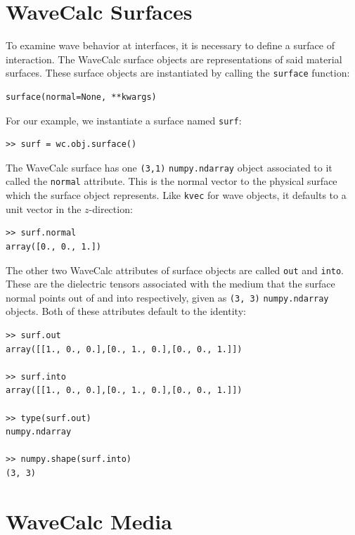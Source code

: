 \documentclass[11pt, reqno]{book}%
\newcounter{ct}
\newcommand{\tw}[1]{{\tt #1}}
\begin{document}
\section{WaveCalc Surfaces}
\label{sec:wcsurfaces}

To examine wave behavior at interfaces, it is necessary to define a surface of interaction. The WaveCalc surface objects are representations of said material surfaces. These surface objects are instantiated by calling the \tw{surface} function:
\begin{verbatim}
surface(normal=None, **kwargs)
\end{verbatim}
\noindent For our example, we instantiate a surface named \tw{surf}:
\begin{verbatim}
>> surf = wc.obj.surface()
\end{verbatim}
The WaveCalc surface has one \tw{(3,1)} \tw{numpy.ndarray} object associated to it called the \tw{normal} attribute. This is the normal vector to the physical surface which the surface object represents. Like \tw{kvec} for wave objects, it defaults to a unit vector in the $z$-direction:
\begin{verbatim}
>> surf.normal
array([0., 0., 1.])
\end{verbatim}
The other two WaveCalc attributes of surface objects are called \tw{out} and \tw{into}. These are the dielectric tensors associated with the medium that the surface normal points out of and into respectively, given as \tw{(3, 3)} \tw{numpy.ndarray} objects. Both of these attributes default to the identity:
\begin{verbatim}
>> surf.out
array([[1., 0., 0.],[0., 1., 0.],[0., 0., 1.]])

>> surf.into
array([[1., 0., 0.],[0., 1., 0.],[0., 0., 1.]])

>> type(surf.out)
numpy.ndarray

>> numpy.shape(surf.into)
(3, 3)
\end{verbatim}



\section{WaveCalc Media}
\label{sec:wcmedia}
\end{document}
